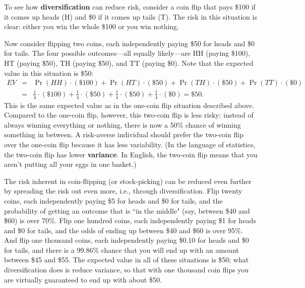 To see how \textbf{diversification} can reduce risk, consider a coin flip that pays \$100 if it comes up heads (H) and \$0 if it comes up tails (T). The risk in this situation is clear: either you win the whole \$100 or you win nothing.

\begin{comment}
The expected value from this coin flip is
\begin{eqnarray*}
EV & = & \Pr(H) \cdot (\$100) + \Pr(T) \cdot (\$0) \\
& = & \frac{1}{2}\cdot (\$100) + \frac{1}{2} \cdot (\$0) \\
& = & \$50.
\end{eqnarray*}
\end{comment}



Now consider flipping two coins, each independently paying \$50 for heads and \$0 for tails. The four possible outcomes---all equally likely---are HH (paying \$100), HT (paying \$50), TH (paying \$50), and TT (paying \$0). Note that the expected value in this situation is \$50:
\begin{eqnarray*}
EV & = & \Pr(HH) \cdot (\$100) + \Pr(HT) \cdot (\$50) + \Pr(TH) \cdot (\$50) + \Pr(TT) \cdot (\$0) \\
& = & \frac{1}{4}\cdot (\$100) + \frac{1}{4}\cdot (\$50) + \frac{1}{4}\cdot (\$50) + \frac{1}{4} \cdot (\$0) = \$50.
\end{eqnarray*}
This is the same expected value as in the one-coin flip situation described above. Compared to the one-coin flip, however, this two-coin flip is less risky: instead of always winning everything or nothing, there is now a 50\% chance of winning something in between. A risk-averse individual should prefer the two-coin flip over the one-coin flip because it has less variability. (In the language of statistics, the two-coin flip has lower \textbf{variance}. In English, the two-coin flip means that you aren't putting all your eggs in one basket.)

The risk inherent in coin-flipping (or stock-picking) can be reduced even further by spreading the risk out even more, i.e., through diversification. Flip twenty coins, each independently paying \$5 for heads and \$0 for tails, and the probability of getting an outcome that is ``in the middle" (say, between \$40 and \$60) is over 70\%. Flip one hundred coins, each independently paying \$1 for heads and \$0 for tails, and the odds of ending up between \$40 and \$60 is over 95\%. And flip one thousand coins, each independently paying \$0.10 for heads and \$0 for tails, and there is a 99.86\% chance that you will end up with an amount between \$45 and \$55. The expected value in all of these situations is \$50; what diversification does is reduce variance, so that with one thousand coin flips you are virtually guaranteed to end up with about \$50.

